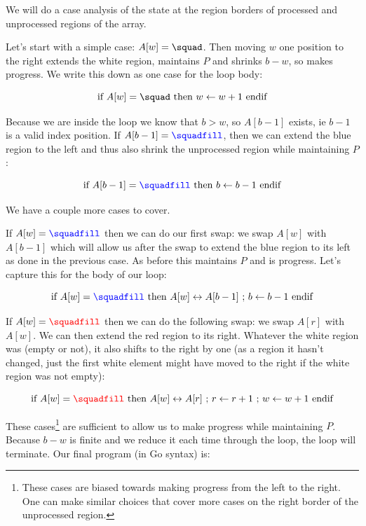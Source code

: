 We will do a case analysis of the state at the region borders of processed and unprocessed regions of the array.

Let's start with a simple case: $A[w] = \squad$. Then moving $w$ one position to the right extends the white region, maintains $P$ and shrinks $b - w$, so makes progress. We write this down as one case for the loop body:

$$
\text{if } A[w] = \squad \text{ then } w \leftarrow w + 1 \text{ endif}
$$

Because we are inside the loop we know that $b > w$, so $A[b - 1]$ exists, ie $b - 1$ is a valid index position. If $A[b - 1] = {\color{blue} \squadfill}$, then we can extend the blue region to the left and thus also shrink the unprocessed region while maintaining $P$:

$$
\text{if } A[b - 1] = {\color{blue} \squadfill} \text{ then } b \leftarrow b - 1 \text{ endif}
$$

We have a couple more cases to cover.

If $A[w] = {\color{blue} \squadfill}$ then we can do our first swap: we swap $A[w]$ with $A[b-1]$ which will allow us after the swap to extend the blue region to its left as done in the previous case. As before this maintains $P$ and is progress. Let's capture this for the body of our loop:

$$
\text{if } A[w] = {\color{blue} \squadfill} \text{ then } A[w] \leftrightarrow A[b-1] \text{ ; } b \leftarrow b - 1 \text{ endif}
$$

If $A[w] = {\color{red} \squadfill}$ then we can do the following swap: we swap $A[r]$ with $A[w]$. We can then extend the red region to its right. Whatever the white region was (empty or not), it also shifts to the right by one (as a region it hasn't changed, just the first white element might have moved to the right if the white region was not empty):

$$
\text{if } A[w] = {\color{red} \squadfill} \text{ then } A[w] \leftrightarrow A[r] \text{ ; } r \leftarrow r + 1 \text{ ; } w \leftarrow w + 1 \text{ endif}
$$

These cases\footnote{These cases are biased towards making progress from the left to the right. One can make similar choices that cover more cases on the right border of the unprocessed region.} are sufficient to allow us to make progress while maintaining $P$. Because $b-w$ is finite and we reduce it each time through the loop, the loop will terminate. Our final program (in Go syntax) is:

